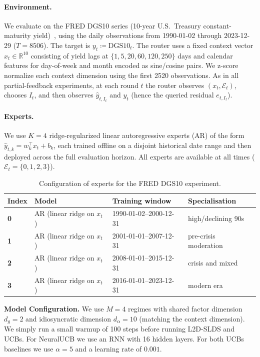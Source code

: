 \paragraph{Environment.}
We evaluate on the FRED DGS10 series (10-year U.S.\ Treasury constant-maturity yield)~\cite{FRED_DGS10}, using the daily
observations from 1990-01-02 through 2023-12-29 (\(T=8506\)).
The target is \(y_t\coloneqq \text{DGS10}_t\). The router uses a fixed context vector \(x_t\in\mathbb{R}^{10}\) consisting of
yield lags at \(\{1,5,20,60,120,250\}\) days and calendar features for day-of-week and month encoded as sine/cosine pairs.
We z-score normalize each context dimension using the first 2520 observations.
As in all partial-feedback experiments, at each round \(t\) the router observes \((x_t,\mathcal{E}_t)\), chooses \(I_t\), and
then observes \(\hat y_{t,I_t}\) and \(y_t\) (hence the queried residual \(e_{t,I_t}\)).

\paragraph{Experts.}
We use \(K=4\) ridge-regularized linear autoregressive experts (AR) of the form \(\hat y_{t,k}=w_k^\top x_t+b_k\), each trained
offline on a disjoint historical date range and then deployed across the full evaluation horizon.  All experts are available at
all times (\(\mathcal{E}_t=\{0,1,2,3\}\)).

\begin{table}[ht]
\centering
\small
\setlength{\tabcolsep}{4pt}
\caption{Configuration of experts for the FRED DGS10 experiment.}
\label{tab:experts_fred_appendix}
\begin{tabular}{@{}llll@{}}
\toprule
Index & Model & Training window & Specialisation \\
\midrule
\textbf{0} & AR (linear ridge on \(x_t\)) & 1990-01-02--2000-12-31 & high/declining 90s \\
\textbf{1} & AR (linear ridge on \(x_t\)) & 2001-01-01--2007-12-31 & pre-crisis moderation\\
\textbf{2} & AR (linear ridge on \(x_t\)) & 2008-01-01--2015-12-31 & crisis and mixed \\
\textbf{3} & AR (linear ridge on \(x_t\)) & 2016-01-01--2023-12-31 & modern era \\
\bottomrule
\end{tabular}
\end{table}

\textbf{Model Configuration.}
We use \(M=4\) regimes with shared factor dimension \(d_g=2\) and idiosyncratic dimension \(d_\alpha=10\) (matching the context
dimension). We simply run a small warmup of 100 steps before
running L2D-SLDS and UCBs. For NeuralUCB we use an RNN with 16 hidden layers. For both UCBs baselines we use
$\alpha=5$ and a learning rate of $0.001$.

